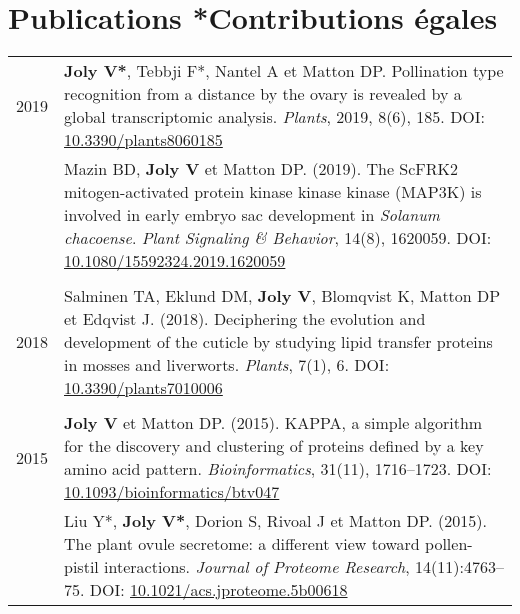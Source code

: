 \documentclass[letterpaper,12pt]{article}
\begin{document}
\vspace{6mm}

\section[Publications]{Publications \hfill \small{*Contributions égales}}

\begin{tabularx}{\textwidth}{@{}r|X@{}}

2019
& \textbf{Joly V*}, Tebbji F*, Nantel A et Matton DP.
  Pollination type recognition from a distance by the ovary is revealed by a
  global transcriptomic analysis.
  \emph{Plants}, 2019, 8(6), 185.
  DOI: \href{http://doi.org/10.3390/plants8060185}{10.3390/plants8060185}
  \vspace{3mm}
  \\

& Mazin BD, \textbf{Joly V} et Matton DP. (2019).
  The ScFRK2 mitogen-activated protein kinase kinase kinase (MAP3K) is involved
  in early embryo sac development in \emph{Solanum chacoense}.
  \emph{Plant Signaling \& Behavior}, 14(8), 1620059.
  DOI: \href{http://doi.org/10.1080/15592324.2019.1620059}
  {10.1080/15592324.2019.1620059}
  \\

\multicolumn{2}{c}{} \\

2018
& Salminen TA, Eklund DM, \textbf{Joly V}, Blomqvist K, Matton DP
  et Edqvist J. (2018).
  Deciphering the evolution and development of the cuticle by studying lipid
  transfer proteins in mosses and liverworts.
  \emph{Plants}, 7(1), 6.
  DOI: \href{http://doi.org/10.3390/plants7010006}{10.3390/plants7010006}
  \\

\multicolumn{2}{c}{} \\

2015
& \textbf{Joly V} et Matton DP. (2015).
  KAPPA, a simple algorithm for the discovery and clustering of proteins defined by
  a key amino acid pattern.
  \emph{Bioinformatics}, 31(11), 1716--1723.
  DOI: \href{http://doi.org/10.1093/bioinformatics/btv047}
  {10.1093/bioinformatics/btv047}
  \vspace{3mm}
  \\

& Liu Y*, \textbf{Joly V*}, Dorion S, Rivoal J et Matton DP. (2015).
  The plant ovule secretome: a different view toward pollen-pistil interactions.
  \emph{Journal of Proteome Research}, 14(11):4763--75.
  DOI: \href{http://doi.org/10.1021/acs.jproteome.5b00618}
  {10.1021/acs.jproteome.5b00618}
  \vspace{3mm}
  \\


\end{tabularx}
\end{document}
